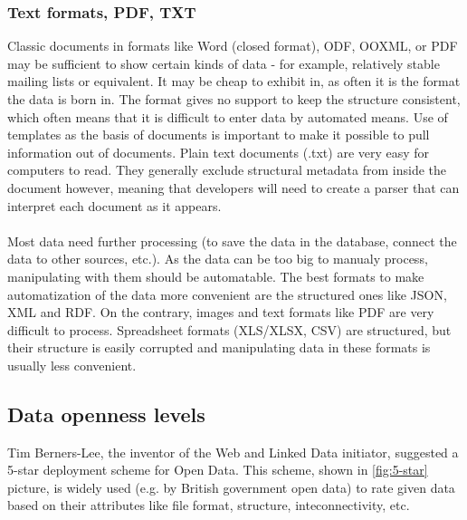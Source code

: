 \documentclass[thesis=B,english]{sprlajur-slovakopendata}[2018/05/12]
\begin{document}
\subsubsection{Text formats, PDF, TXT}
Classic documents in formats like Word (closed format), ODF, OOXML, or PDF may be sufficient to show certain kinds of data - for example, relatively stable mailing lists or equivalent. It may be cheap to exhibit in, as often it is the format the data is born in. The format gives no support to keep the structure consistent, which often means that it is difficult to enter data by automated means. Use of templates as the basis of documents is important to make it possible to pull information out of documents.
Plain text documents (.txt) are very easy for computers to read. They generally exclude structural metadata from inside the document however, meaning that developers will need to create a parser that can interpret each document as it appears.
\paragraph{}Most data need further processing (to save the data in the database, connect the data to other sources, etc.). As the data can be too big to manualy process, manipulating with them should be automatable. The best formats to make automatization of the data more convenient are the structured ones like JSON, XML and RDF. On the contrary, images and text formats like PDF are very difficult to process. Spreadsheet formats (XLS/XLSX, CSV) are structured, but their structure is easily corrupted and manipulating data in these formats is usually less convenient.

\subsection{Data openness levels}
Tim Berners-Lee, the inventor of the Web and Linked Data initiator, suggested a 5-star deployment scheme for Open Data. This scheme, shown in \ref{fig:5-star} picture, is widely used (e.g. by British government open data) to rate given data based on their attributes like file format, structure, inteconnectivity, etc.
\end{document}
